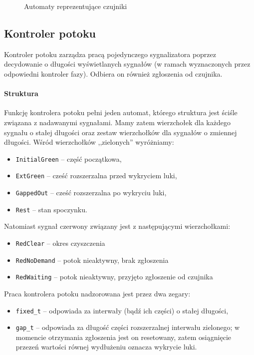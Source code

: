 \documentclass{pracamgr}
\theoremstyle{plain}
\begin{document}
\begin{figure}
  \centering
  \hspace{1cm}
  \caption{Automaty reprezentujące czujniki}
  \label{img:detectors}
\end{figure}

\subsection{Kontroler potoku}
Kontroler potoku zarządza pracą pojedynczego sygnalizatora poprzez
decydowanie o długości wyświetlanych sygnałów (w ramach wyznaczonych
przez odpowiedni kontroler fazy). Odbiera on również zgłoszenia od
czujnika.

\paragraph{Struktura} Funkcję kontrolera potoku pełni jeden automat,
którego struktura jest ściśle związana z nadawanymi sygnałami. Mamy
zatem wierzchołek dla każdego sygnału o stałej długości oraz zestaw
wierzchołków dla sygnałów o zmiennej długości. Wśród wierzchołków
,,zielonych'' wyróżniamy:
\begin{itemize}
  \item \texttt{InitialGreen} -- część początkowa,
  \item \texttt{ExtGreen} -- cześć rozszerzalna przed wykryciem luki,
  \item \texttt{GappedOut} -- cześć rozszerzalna po wykryciu luki,
  \item \texttt{Rest} -- stan spoczynku.
\end{itemize}
Natomiast sygnał czerwony związany jest z następującymi wierzchołkami:
\begin{itemize}
  \item \texttt{RedClear} -- okres czyszczenia
  \item \texttt{RedNoDemand} -- potok nieaktywny, brak zgłoszenia
  \item \texttt{RedWaiting} -- potok nieaktywny, przyjęto zgłoszenie
  od czujnika
\end{itemize}
Praca kontrolera potoku nadzorowana jest przez dwa zegary:
\begin{itemize}
  \item \texttt{fixed\_t} -- odpowiada za interwały (bądź ich części) o
  stałej długości,
  \item \texttt{gap\_t} -- odpowiada za długość części rozszerzalnej
  interwału zielonego; w momencie otrzymania zgłoszenia jest on
  resetowany, zatem osiągnięcie przezeń wartości równej wydłużeniu
  oznacza wykrycie luki.
\end{itemize}
\end{document}
